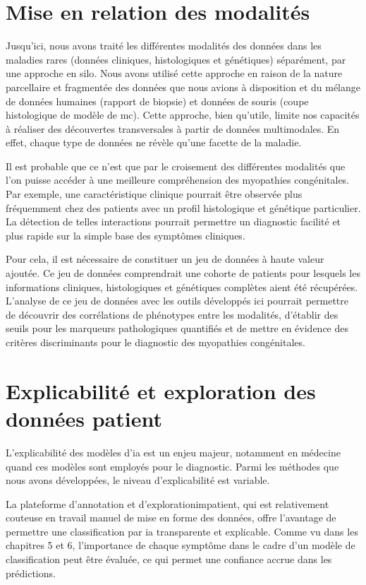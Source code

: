 \section{Mise en relation des modalités}
Jusqu’ici, nous avons traité les différentes modalités des données dans les maladies rares (données cliniques, histologiques et génétiques) séparément, par une approche en silo. Nous avons utilisé cette approche en raison de la nature parcellaire et fragmentée des données que nous avions à disposition et du mélange de données humaines (rapport de biopsie) et données de souris (coupe histologique de modèle de \gls{mc}). Cette approche, bien qu'utile, limite nos capacités à réaliser des découvertes transversales à partir de données multimodales. En effet, chaque type de données ne révèle qu'une facette de la maladie. 

Il est probable que ce n'est que par le croisement des différentes modalités que l'on puisse accéder à une meilleure compréhension des myopathies congénitales. Par exemple, une caractéristique clinique pourrait être observée plus fréquemment chez des patients avec un profil histologique et génétique particulier. La détection de telles interactions pourrait permettre un diagnostic facilité et plus rapide sur la simple base des symptômes cliniques.

Pour cela, il est nécessaire de constituer un jeu de données à haute valeur ajoutée. Ce jeu de données comprendrait une cohorte de patients pour lesquels les informations cliniques, histologiques et génétiques complètes aient été récupérées. L'analyse de ce jeu de données avec les outils développés ici pourrait permettre de découvrir des corrélations de phénotypes entre les modalités, d'établir des seuils pour les marqueurs pathologiques quantifiés et de mettre en évidence des critères discriminants pour le diagnostic des myopathies congénitales.

\section{Explicabilité et exploration des données patient}
L'explicabilité des modèles d'\gls{ia} est un enjeu majeur, notamment en médecine quand ces modèles sont employés pour le diagnostic. Parmi les méthodes que nous avons développées, le niveau d'explicabilité est variable.

La plateforme d'annotation et d'exploration\gls{impatient}, qui est relativement couteuse en travail manuel de mise en forme des données, offre l'avantage de permettre une classification par \gls{ia} transparente et explicable. Comme vu dans les chapitres 5 et 6, l'importance de chaque symptôme dans le cadre d'un modèle de classification peut être évaluée, ce qui permet une confiance accrue dans les prédictions.

